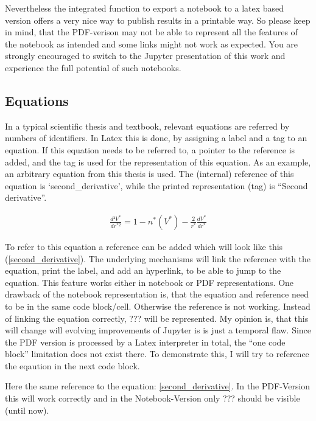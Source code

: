 \documentclass[11pt]{article}
\begin{document}
Nevertheless the integrated function to export a notebook to a latex
based version offers a very nice way to publish results in a printable
way. So please keep in mind, that the PDF-verison may not be able to
represent all the features of the notebook as intended and some links
might not work as expected. You are strongly encouraged to switch to the
Jupyter presentation of this work and experience the full potential of
such notebooks.

\hypertarget{equations}{%
\subsection{Equations}\label{equations}}

In a typical scientific thesis and textbook, relevant equations are
referred by numbers of identifiers. In Latex this is done, by assigning
a label and a tag to an equation. If this equation needs to be referred
to, a pointer to the reference is added, and the tag is used for the
representation of this equation. As an example, an arbitrary equation
from this thesis is used. The (internal) reference of this equation is
`second\_derivative', while the printed representation (tag) is ``Second
derivative''.

\begin{align}
\frac{d²V^{*}}{dr^{*2}}=1-n^{*}(V^{*})-\frac{2}{r^{*}}\frac{dV^{*}}{dr^{*}}\label{second_derivative}\tag{Second derivative}
\end{align}

To refer to this equation a reference can be added which will look like
this (\ref{second_derivative}). The underlying mechanisms will link the
reference with the equation, print the label, and add an hyperlink, to
be able to jump to the equation. This feature works either in notebook
or PDF representations. One drawback of the notebook representation is,
that the equation and reference need to be in the same code block/cell.
Otherwise the reference is not working. Instead of linking the equation
correctly, ??? will be represented. My opinion is, that this will change
will evolving improvements of Jupyter is is just a temporal flaw. Since
the PDF version is processed by a Latex interpreter in total, the ``one
code block'' limitation does not exist there. To demonstrate this, I
will try to reference the eqaution in the next code block.

    Here the same reference to the equation: \ref{second_derivative}. In the
PDF-Version this will work correctly and in the Notebook-Version only
??? should be visible (until now).
\end{document}
